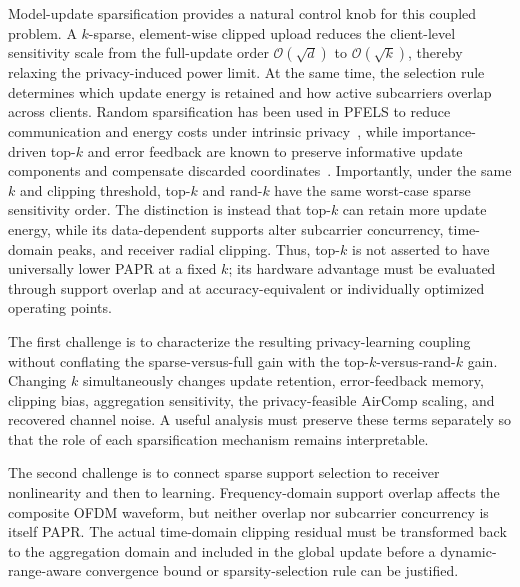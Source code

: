 \documentclass[journal]{IEEEtran}
\newcommand{\rev}[1]{{\color{revisionred}#1}}
\begin{document}
Model-update sparsification provides a natural control knob for this coupled problem. A $k$-sparse, element-wise clipped upload reduces the client-level sensitivity scale from the full-update order $\mathcal{O}(\sqrt{d})$ to $\mathcal{O}(\sqrt{k})$, thereby relaxing the privacy-induced power limit. At the same time, the selection rule determines which update energy is retained and how active subcarriers overlap across clients. Random sparsification has been used in PFELS to reduce communication and energy costs under intrinsic privacy~\cite{zhang2023communication}, while importance-driven top-$k$ and error feedback are known to preserve informative update components and compensate discarded coordinates~\cite{lin2018deep,cao2023overview}. Importantly, under the same $k$ and clipping threshold, top-$k$ and rand-$k$ have the same worst-case sparse sensitivity order. The distinction is instead that top-$k$ can retain more update energy, while its data-dependent supports alter subcarrier concurrency, time-domain peaks, and receiver radial clipping. Thus, top-$k$ is not asserted to have universally lower PAPR at a fixed $k$; its hardware advantage must be evaluated through support overlap and at accuracy-equivalent or individually optimized operating points.

The first challenge is to characterize the resulting privacy-learning coupling without conflating the sparse-versus-full gain with the top-$k$-versus-rand-$k$ gain. Changing $k$ simultaneously changes update retention, error-feedback memory, clipping bias, aggregation sensitivity, the privacy-feasible AirComp scaling, and recovered channel noise. A useful analysis must preserve these terms separately so that the role of each sparsification mechanism remains interpretable.

\rev{The second challenge is to connect sparse support selection to receiver nonlinearity and then to learning. Frequency-domain support overlap affects the composite OFDM waveform, but neither overlap nor subcarrier concurrency is itself PAPR. The actual time-domain clipping residual must be transformed back to the aggregation domain and included in the global update before a dynamic-range-aware convergence bound or sparsity-selection rule can be justified.}
\end{document}
